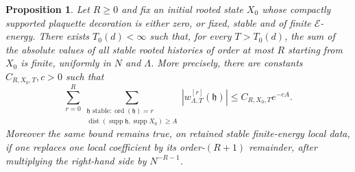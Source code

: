 \documentclass[11pt,a4paper,reqno]{amsart}
\newtheorem{proposition}[theorem]{Proposition}
\theoremstyle{definition}
\theoremstyle{remark}
\begin{document}
\begin{proposition}\label{prop:trajectory-estimate}
Let $R\ge0$ and fix an initial rooted state $X_0$ whose compactly supported plaquette decoration is either zero, or fixed, stable and of finite $\mathcal E$-energy.  There exists $T_0(d)<\infty$ such that, for every $T>T_0(d)$, the sum of the absolute values of all stable rooted histories of order at most $R$ starting from $X_0$ is finite, uniformly in $N$ and $\Lambda$.  More precisely, there are constants $C_{R,X_0,T},c>0$ such that
\begin{equation}\label{eq:history-locality}
\sum_{r=0}^R\sum_{\substack{\mathfrak h\text{ stable}: \operatorname{ord}(\mathfrak h)=r\\
\operatorname{dist}(\operatorname{supp}\mathfrak h,\operatorname{supp}X_0)\ge A}}
|w^{[r]}_{\Lambda,T}(\mathfrak h)|
\le
C_{R,X_0,T}e^{-cA}.
\end{equation}
Moreover the same bound remains true, on retained stable finite-energy local data, if one replaces one local coefficient by its order-$(R+1)$ remainder, after multiplying the right-hand side by $N^{-R-1}$.
\end{proposition}
\end{document}

